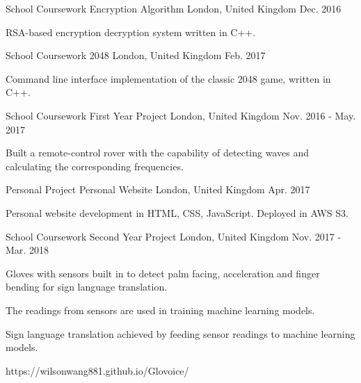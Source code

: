 
\begin{cventries}
  \cventry
    {School Coursework} %
    {Encryption Algorithm} %
    {London, United Kingdom} %
    {Dec. 2016} %
    {
      \begin{cvitems} %
        \item {RSA-based encryption decryption system written in C++.}
      \end{cvitems}
    }
    
    \cventry
    {School Coursework} %
    {2048} %
    {London, United Kingdom} %
    {Feb. 2017} %
    {
      \begin{cvitems} %
        \item {Command line interface implementation of the classic 2048 game, written in C++.}
      \end{cvitems}
    }
    
    \cventry
    {School Coursework} %
    {First Year Project} %
    {London, United Kingdom} %
    {Nov. 2016 - May. 2017} %
    {
      \begin{cvitems} %
        \item {Built a remote-control rover with the capability of detecting waves
        and calculating the corresponding frequencies.}
      \end{cvitems}
    }
    
    \cventry
    {Personal Project} %
    {Personal Website} %
    {London, United Kingdom} %
    {Apr. 2017} %
    {
      \begin{cvitems} %
        \item {Personal website development in HTML, CSS, JavaScript. Deployed in AWS S3.}
      \end{cvitems}
    }
    
    \cventry
    {School Coursework} %
    {Second Year Project} %
    {London, United Kingdom} %
    {Nov. 2017 - Mar. 2018} %
    {
      \begin{cvitems} %
        \item {Gloves with sensors built in to detect palm facing, acceleration and finger bending for sign language translation.}
        \item {The readings from sensors are used in training machine learning models.}
        \item {Sign language translation achieved by feeding sensor readings to machine learning models.}
        \item {https://wilsonwang881.github.io/Glovoice/}
      \end{cvitems}
    }
    

\end{cventries}
